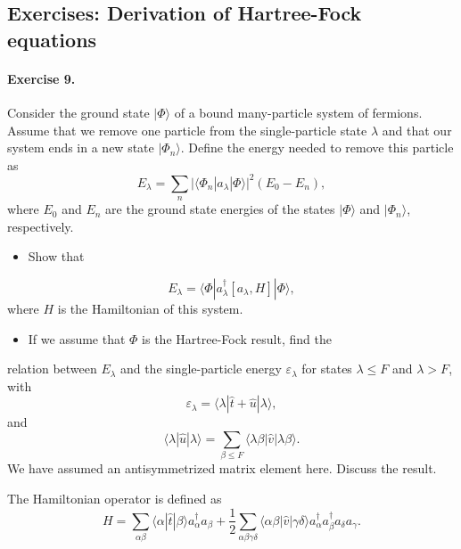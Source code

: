 \documentclass[%
twoside,                 %
final,                   %
10pt]{article}
\begin{document}
\subsection*{Exercises: Derivation of Hartree-Fock equations}

\paragraph{Exercise 9.}
Consider the ground state $|\Phi\rangle$ 
of a bound many-particle system of fermions. Assume that we remove one particle
from the single-particle state $\lambda$ and that our system ends in a new state
$|\Phi_{n}\rangle$. 
Define the energy needed to remove this particle as
\[
E_{\lambda}=\sum_{n}\vert\langle\Phi_{n}|a_{\lambda}|\Phi\rangle\vert^{2}(E_{0}-E_{n}),
\]
where $E_{0}$ and $E_{n}$  are the ground state energies of the states
$|\Phi\rangle$  and  $|\Phi_{n}\rangle$, respectively.
\begin{itemize}
 \item Show that
\end{itemize}

\noindent
\[
E_{\lambda}=\langle\Phi|a_{\lambda}^{\dagger}\left[
a_{\lambda},H \right]|\Phi\rangle,
\]
where $H$ is the Hamiltonian of this system.
\begin{itemize}
 \item If we assume that $\Phi$ is the  Hartree-Fock result, find the 
\end{itemize}

\noindent
relation between $E_{\lambda}$ and the single-particle energy
$\varepsilon_{\lambda}$
for states $\lambda \leq F$ and $\lambda >F$, with
\[
\varepsilon_{\lambda}=\langle\lambda|\hat{t}+\hat{u}|\lambda\rangle,
\]
and
\[
\langle\lambda|\hat{u}|\lambda\rangle=\sum_{\beta \leq F}
\langle\lambda\beta|\hat{v}|\lambda\beta\rangle.
\]
We have assumed an antisymmetrized matrix element here.
Discuss the result.

The Hamiltonian operator is defined as
\[
H=\sum_{\alpha\beta}\langle\alpha|\hat{t}|\beta\rangle a_{\alpha}^{\dagger}a_{\beta}+
\frac{1}{2}\sum_{\alpha\beta\gamma\delta}\langle\alpha\beta|\hat{v}|\gamma\delta\rangle a_{\alpha}^{\dagger}a_{\beta}^{\dagger}a_{\delta}a_{\gamma}.
\]









\printindex
\end{document}
